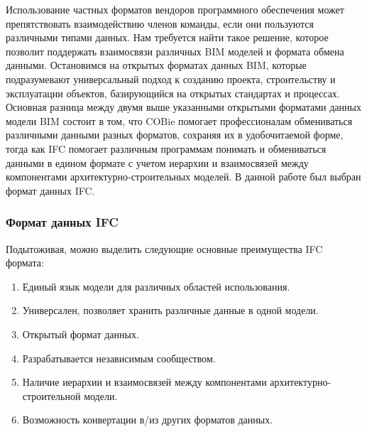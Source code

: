 \documentclass[a4paper,14pt]{extreport} %
\begin{document}
Использование частных форматов вендоров программного обеспечения может препятствовать взаимодействию членов команды, если они пользуются различными типами данных. Нам требуется найти такое решение, которое позволит поддержать взаимосвязи различных BIM моделей и формата обмена данными. Остановимся на открытых форматах данных BIM, которые подразумевают универсальный подход к созданию проекта, строительству и эксплуатации объектов, базирующийся на открытых стандартах и процессах. \\
Основная разница между двумя выше указанными открытыми форматами данных модели BIM состоит в том, что COBie помогает профессионалам обмениваться различными данными разных форматов, сохраняя их в удобочитаемой форме, тогда как IFC помогает различным программам понимать и обмениваться данными в едином формате с учетом иерархии и взаимосвязей между компонентами архитектурно-строительных моделей. В данной работе был выбран формат данных IFC. \\

\subsubsection{Формат данных IFC}
Подытоживая, можно выделить следующие основные преимущества IFC формата:
\begin{enumerate}
\item Единый язык модели для различных областей использования.
\item Универсален, позволяет хранить различные данные в одной модели.
\item Открытый формат данных.
\item Разрабатывается независимым сообществом.
\item Наличие иерархии и взаимосвязей между компонентами архитектурно-строительной модели.
\item Возможность конвертации в/из других форматов данных.
\end{enumerate} 
\end{document}
